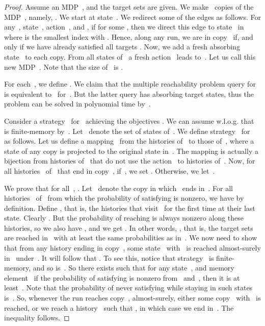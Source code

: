 \documentclass{llncs}
\begin{document}
\begin{proof}
  Assume an MDP~,  and the target sets  are given.
  We make~ copies of the MDP~, namely, . We start  at state~.
  We redirect some of the edges as follows.
  For any~, state~, action~, and , if  for some , then we direct this edge to state~ in 
  where  is the smallest index with .
  Hence, along any run, we are in copy~ if, and only if we have already satisfied all targets .
  Now, we add a fresh absorbing state~ to each copy. From all states of~ a fresh action~ leads to~.
  Let us call this new MDP~. Note that the size of~ is .

  For each~, we define .
  We claim that the multiple reachability problem query  for~
  is equivalent to~ for~. But the latter query has absorbing target states, thus the problem can be solved in polynomial time
  by~\cite{EKVY-lmcs08}.
  
  Consider a strategy~ for~ achieving the objectives .
  We can assume w.l.o.g. that~ is finite-memory by~\cite{EKVY-lmcs08}.
  Let~ denote the set of states of~.
  We define strategy~ for~ as follows. Let us define a mapping~ from the histories of~ to those of~, where a state of any copy
  is projected to the original state in~. The mapping is actually a bijection from histories of~ that do not use the action~
  to histories of~.
  Now, for all histories~ of~ that end in copy~,
  if~, we set . Otherwise, we let~.

  We prove that for all~, .
  Let~ denote the copy in which~ ends in~.
  For all histories~ of~ from which the probability of satisfying  is nonzero,
  we have  by definition.
  Define ,
  that is, the histories that visit~ for the first time at their last state.
  Clearly .
  But the probability of reaching   is always nonzero along these histories, so 
  we also have ,
  and we get .
  In other words, ,
  that is, the target sets  are reached in~ with at least the same probabilities as in~.
  We now need to show that from any history ending in copy~, some state~ with~
  is reached almost-surely in~ under~. It will follow that
  .
  To see this, notice that strategy~ is finite-memory, and so is~. 
  So there exists  such that for any state~, and memory element~
  if the probability of satisfying  is nonzero from~ and~, 
  then it is at least~. Note that the probability of never satisfying
   while staying in such states is~.
  So, whenever the run reaches copy~, almost-surely,
  either some copy~ with~ is reached, or we reach a history~ such that , in which case we end in~.
  The inequality follows.



\end{proof}
\end{document}
